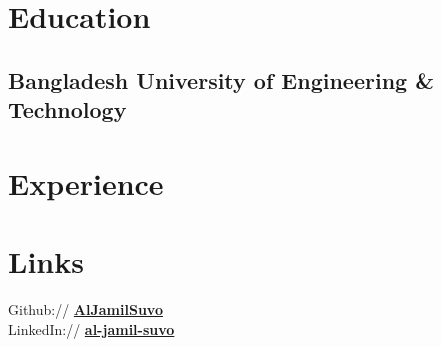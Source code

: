 \documentclass[]{deedy-resume-openfont}
\begin{document}
%
%
\lastupdated

%
%

%
%

\begin{minipage}[t]{0.33\textwidth} 


\section{Education} 

\subsection{Bangladesh University of Engineering \& Technology}
\sectionsep

\section{Experience}
\sectionsep



\section{Links} 
Github:// \href{https://github.com/AlJamilSuvo}{\bf AlJamilSuvo} \\
LinkedIn://  \href{https://www.linkedin.com/in/al-jamil-suvo/}{\bf al-jamil-suvo} \\






\end{minipage}
\end{document}
